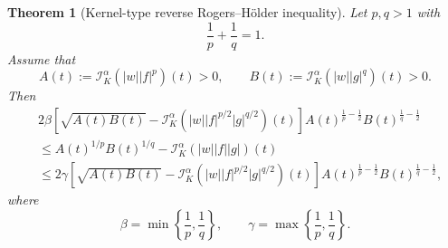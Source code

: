 \documentclass[10pt,a4paper]{amsart}
\newtheorem{theorem}{Theorem}
\begin{document}
\begin{theorem}[Kernel-type reverse Rogers--H\"older inequality]
Let $p,q>1$ with
\[
    \frac1p+\frac1q=1.
\]
Assume that
\[
    A(t):=\mathcal{I}_{K}^{\alpha}(|w||f|^p)(t)>0,
    \qquad
    B(t):=\mathcal{I}_{K}^{\alpha}(|w||g|^q)(t)>0.
\]
Then
\[
\begin{aligned}
&2\beta
\left[
\sqrt{A(t)B(t)}
-
\mathcal{I}_{K}^{\alpha}
\left(|w||f|^{p/2}|g|^{q/2}\right)(t)
\right]
A(t)^{\frac1p-\frac12}
B(t)^{\frac1q-\frac12}                                      \\
&\leq
A(t)^{1/p}B(t)^{1/q}
-
\mathcal{I}_{K}^{\alpha}(|w||f||g|)(t)                       \\
&\leq
2\gamma
\left[
\sqrt{A(t)B(t)}
-
\mathcal{I}_{K}^{\alpha}
\left(|w||f|^{p/2}|g|^{q/2}\right)(t)
\right]
A(t)^{\frac1p-\frac12}
B(t)^{\frac1q-\frac12},
\end{aligned}
\]
where
\[
    \beta=\min\left\{\frac1p,\frac1q\right\},
    \qquad
    \gamma=\max\left\{\frac1p,\frac1q\right\}.
\]
\end{theorem}
\end{document}
